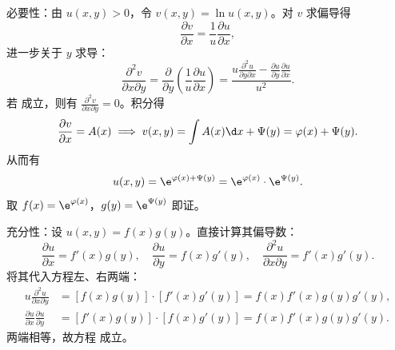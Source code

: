 \begin{myproof}

    必要性：由 $u(x, y) > 0$，令 $v(x, y) = \ln u(x, y)$。对 $v$ 求偏导得
    \begin{equation}
        \frac{\partial v}{\partial x} = \frac{1}{u} \frac{\partial u}{\partial x},
        \label{eq:vx-pde}
    \end{equation}
    进一步关于 $y$ 求导：
    \begin{equation}
        \frac{\partial^2 v}{\partial x \partial y} = \frac{\partial}{\partial y} \left( \frac{1}{u} \frac{\partial u}{\partial x} \right) = \frac{u \frac{\partial^2 u}{\partial y \partial x} - \frac{\partial u}{\partial y} \frac{\partial u}{\partial x}}{u^2}.
        \label{eq:vxy-pde}
    \end{equation}
    若  成立，则有 $\frac{\partial^2 v}{\partial x \partial y} = 0$。积分得
    \begin{equation}
        \frac{\partial v}{\partial x} = A(x) \implies v(x, y) = \int A(x) \d x + \Psi(y) = \varphi(x) + \Psi(y).
        \label{eq:v-integral}
    \end{equation}
    从而有
    \begin{equation}
        u(x, y) = \e^{\varphi(x) + \Psi(y)} = \e^{\varphi(x)} \cdot \e^{\Psi(y)}.
        \label{eq:u-sep-form}
    \end{equation}
    取 $f(x) = \e^{\varphi(x)}$，$g(y) = \e^{\Psi(y)}$ 即证。

    充分性：设 $u(x, y) = f(x)g(y)$。直接计算其偏导数：
    \begin{equation}
        \frac{\partial u}{\partial x} = f'(x)g(y), \quad \frac{\partial u}{\partial y} = f(x)g'(y), \quad \frac{\partial^2 u}{\partial x \partial y} = f'(x)g'(y).
        \label{eq:suff-deriv}
    \end{equation}
    将其代入方程左、右两端：
    \begin{equation}
        \begin{aligned}
            u \frac{\partial^2 u}{\partial x \partial y}                & = [f(x)g(y)] \cdot [f'(x)g'(y)] = f(x)f'(x)g(y)g'(y), \\
            \frac{\partial u}{\partial x} \frac{\partial u}{\partial y} & = [f'(x)g(y)] \cdot [f(x)g'(y)] = f(x)f'(x)g(y)g'(y).
        \end{aligned}
        \label{eq:suff-verify}
    \end{equation}
    两端相等，故方程  成立。
\end{myproof}


